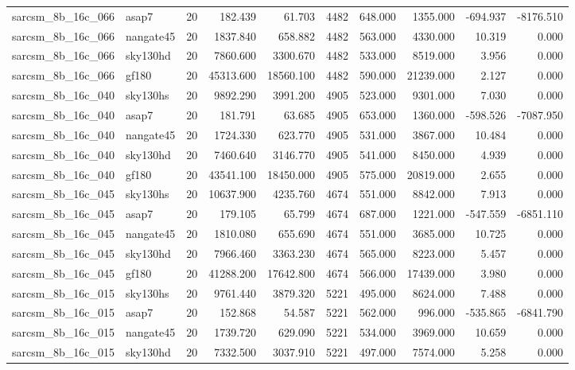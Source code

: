 \begin{longtable}{llrrrrrrrr}
sarcsm\_8b\_16c\_066 & asap7 & 20 & 182.439 & 61.703 & 4482 & 648.000 & 1355.000 & -694.937 & -8176.510 \\
sarcsm\_8b\_16c\_066 & nangate45 & 20 & 1837.840 & 658.882 & 4482 & 563.000 & 4330.000 & 10.319 & 0.000 \\
sarcsm\_8b\_16c\_066 & sky130hd & 20 & 7860.600 & 3300.670 & 4482 & 533.000 & 8519.000 & 3.956 & 0.000 \\
sarcsm\_8b\_16c\_066 & gf180 & 20 & 45313.600 & 18560.100 & 4482 & 590.000 & 21239.000 & 2.127 & 0.000 \\
sarcsm\_8b\_16c\_040 & sky130hs & 20 & 9892.290 & 3991.200 & 4905 & 523.000 & 9301.000 & 7.030 & 0.000 \\
sarcsm\_8b\_16c\_040 & asap7 & 20 & 181.791 & 63.685 & 4905 & 653.000 & 1360.000 & -598.526 & -7087.950 \\
sarcsm\_8b\_16c\_040 & nangate45 & 20 & 1724.330 & 623.770 & 4905 & 531.000 & 3867.000 & 10.484 & 0.000 \\
sarcsm\_8b\_16c\_040 & sky130hd & 20 & 7460.640 & 3146.770 & 4905 & 541.000 & 8450.000 & 4.939 & 0.000 \\
sarcsm\_8b\_16c\_040 & gf180 & 20 & 43541.100 & 18450.000 & 4905 & 575.000 & 20819.000 & 2.655 & 0.000 \\
sarcsm\_8b\_16c\_045 & sky130hs & 20 & 10637.900 & 4235.760 & 4674 & 551.000 & 8842.000 & 7.913 & 0.000 \\
sarcsm\_8b\_16c\_045 & asap7 & 20 & 179.105 & 65.799 & 4674 & 687.000 & 1221.000 & -547.559 & -6851.110 \\
sarcsm\_8b\_16c\_045 & nangate45 & 20 & 1810.080 & 655.690 & 4674 & 551.000 & 3685.000 & 10.725 & 0.000 \\
sarcsm\_8b\_16c\_045 & sky130hd & 20 & 7966.460 & 3363.230 & 4674 & 565.000 & 8223.000 & 5.457 & 0.000 \\
sarcsm\_8b\_16c\_045 & gf180 & 20 & 41288.200 & 17642.800 & 4674 & 566.000 & 17439.000 & 3.980 & 0.000 \\
sarcsm\_8b\_16c\_015 & sky130hs & 20 & 9761.440 & 3879.320 & 5221 & 495.000 & 8624.000 & 7.488 & 0.000 \\
sarcsm\_8b\_16c\_015 & asap7 & 20 & 152.868 & 54.587 & 5221 & 562.000 & 996.000 & -535.865 & -6841.790 \\
sarcsm\_8b\_16c\_015 & nangate45 & 20 & 1739.720 & 629.090 & 5221 & 534.000 & 3969.000 & 10.659 & 0.000 \\
sarcsm\_8b\_16c\_015 & sky130hd & 20 & 7332.500 & 3037.910 & 5221 & 497.000 & 7574.000 & 5.258 & 0.000 \\

\end{longtable}
